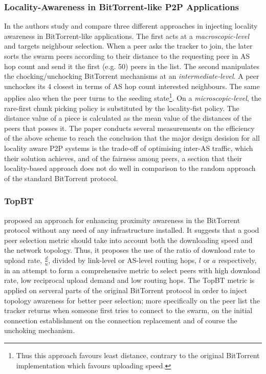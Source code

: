 \subsubsection{Locality-Awareness in BitTorrent-like P2P Applications}
In \cite{lclx_bitlocal_2009} the authors study and compare three different
approaches in injecting locality awareness in BitTorrent-like applications. The
first acts at a \emph{macroscopic-level} and targets neighbour selection. When a
peer asks the tracker to join, the later sorts the swarm peers according to
their distance to the requesting peer in AS hop count and send it the first
(e.g. 50) peers in the list. The second manipulates the chocking/unchocking
BitTorrent mechanisms at an \emph{intermediate-level}. A peer unchockes its 4
closest in terms of AS hop count interested neighbours. The same applies also
when the peer turns to the seeding state\footnote{Thus this approach favours
least distance, contrary to the original BitTorrent implementation which favours
uploading speed.}. On a \emph{microscopic-level}, the rare-first chunk picking
policy is substituted by the locality-fist policy. The distance value of a piece
is calculated as the mean value of the distances of the peers that posses it.
The paper conducts several measurements on the efficiency of the above scheme to
reach the conclusion that the major design desision for all locality aware P2P
systems is the trade-off of optimising inter-AS traffic, which their solution
achieves, and of the fairness among peers, a section that their locality-based
approach does not do well in comparison to the random approach of the standard
BitTorrent protocol.

\subsubsection{TopBT}
\cite{rtl_topbt_2010} proposed an approach for enhancing proximity awareness
in the BitTorrent protocol without any need of any infrastructure installed. It
suggests that a good peer selection metric should take into account both the
downloading speed and the network topology. Thus, it proposes the use of the
ratio of download rate to upload rate, $\frac{d}{u}$, divided by link-level or
AS-level routing hops, $l$ or $a$ respectively, in an attempt to form a
comprehensive metric to select peers with high download rate, low reciprocal
upload demand and low routing hops. The TopBT metric is applied on serveral
parts of the original BitTorrent protocol in order to inject topology awareness
for better peer selection; more specifically on the peer list the tracker
returns when someone first tries to connect to the swarm, on the initial
connection establishment on the connection replacement and of course the
unchoking mechanism.

